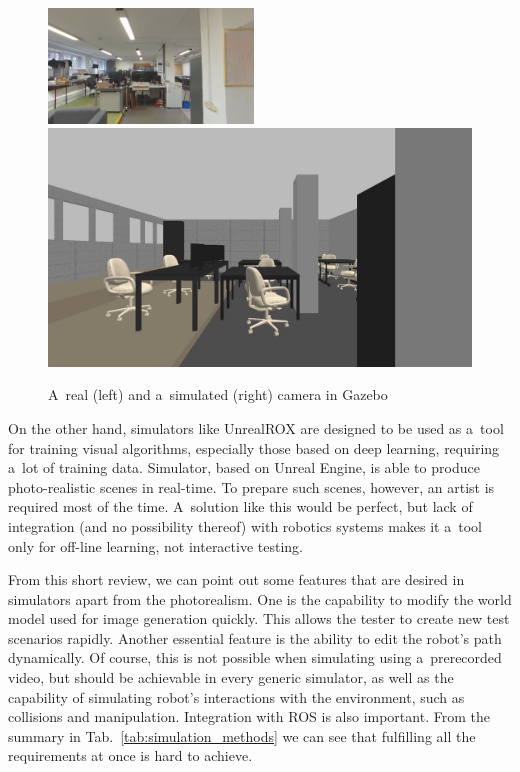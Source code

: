\documentclass{svproc}
\begin{document}
\begin{figure}[!ht]
    \includegraphics[width=0.485\textwidth]{img/gazebo_vs_real/real.jpg}\hfill%
    \includegraphics[width=0.485\linewidth]{img/gazebo_vs_real/gazebo.jpg}
    \caption{A~real (left) and a~simulated (right) camera in Gazebo}
    \label{fig:gazebo_vs_real}
\end{figure}

On the other hand, simulators like UnrealROX are designed to be used as a~tool for training visual algorithms,
especially those based on deep learning, requiring a~lot of training data. Simulator, based on Unreal Engine, 
is able to produce photo-realistic scenes in real-time.
To prepare such scenes, 
however, an artist is required most of the time. A~solution like this would be perfect, but lack of integration 
(and no possibility thereof) with robotics systems makes it a~tool only for off-line learning, not interactive
testing.


From this short review, we can point out some features that are desired in simulators \cite{staranowicz2011survey} 
apart from the photorealism.
One is the capability to modify the world model used for image generation quickly.
This allows the tester to create new test scenarios rapidly.
Another essential feature is the ability to edit the robot's path dynamically.
Of course, this is not possible when simulating using a~prerecorded video, but should be achievable 
in every generic simulator, as well as the capability of simulating robot's interactions with the
environment, such as collisions and manipulation. Integration with ROS is also important. From the summary
in Tab.~\ref{tab:simulation_methods} we can see that fulfilling all the requirements at once is hard to achieve.
\end{document}
